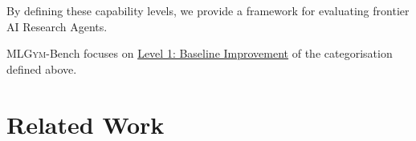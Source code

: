 \documentclass[]{fairmeta}
\newcommand{\mlgym}{\fontfamily{lmr}\selectfont\mdseries\textsc{MLGym}\xspace}
\begin{document}
By defining these capability levels, we provide a framework for evaluating frontier AI Research Agents. 

\mlgym-Bench focuses on \ul{Level 1: Baseline Improvement} of the categorisation defined above.




\section{Related Work}
\label{sec:related}

\end{document}
